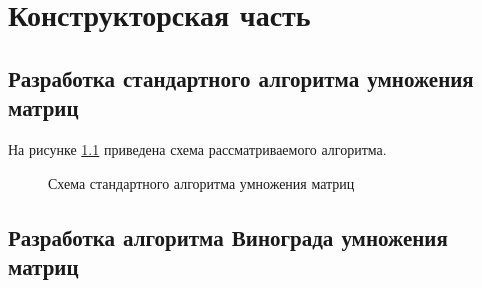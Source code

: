 \chapter{Конструкторская часть}
\section{Разработка стандартного алгоритма умножения матриц}

На рисунке \ref{fig:normal} приведена схема рассматриваемого алгоритма.
\FloatBarrier
\begin{figure}[h]

	\caption{Схема стандартного алгоритма умножения матриц}
	
	\label{fig:normal}
\end{figure}
\FloatBarrier
\clearpage

\section{Разработка алгоритма Винограда умножения матриц}


